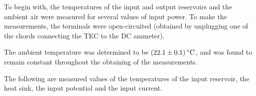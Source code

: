 \begin{paper}
	
	To begin with, the temperatures of the input and output reservoirs and the ambient air were measured for several values of input power. To make the measurements, the terminals were open-circuited (obtained by unplugging one of the chords connecting the TEC to the DC ammeter).
	
	The ambient temperature was determined to be \( \left(22.1 \pm 0.1\right) \si{\celsius} \), and was found to remain constant throughout the obtaining of the measurements. 
	
	The following are measured values of the temperatures of the input reservoir, the heat sink, the input potential and the input current.
	


\end{paper}
